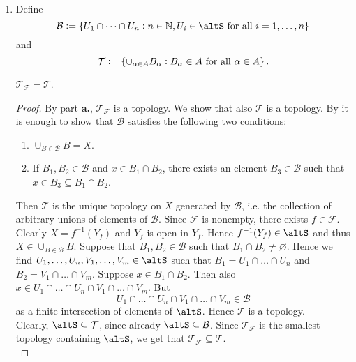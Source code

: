 \begin{enumerate}[label = \textbf{Exercise \arabic*.},wide = 0pt, itemsep = 1.5ex]
\begin{enumerate}[label = \textbf{\alph*.},wide = 0pt, itemsep = 1.5ex]
			\item Define
				\begin{equation*}
					\mathcal{B} := \cbr{U_1 \cap \dots \cap U_n : n \in \mathbb{N},U_i \in \mathcal{\altS} \text{ for all } i = 1,\dots,n}
				\end{equation*}
				\noindent and 
				\begin{equation*}
					\mathcal{T} := \cbr{\textstyle{\cup}_{\alpha \in A} B_\alpha : B_\alpha \in A \text{ for all } \alpha \in A}.
				\end{equation*}
		
				\begin{lemma}
					$\mathcal{T}_\mathcal{F} = \mathcal{T}$.
				\end{lemma}

				\begin{proof}
					By part \textbf{a.}, $\mathcal{T}_\mathcal{F}$ is a topology. We show that also $\mathcal{T}$ is a topology. By \cite[34]{lee:topological_manifolds:2011} it is enough to show that $\mathcal{B}$ satisfies the following two conditions:
					\begin{enumerate}[label = (\roman*)]
						\item $\cup_{B \in \mathcal{B}} B = X$.
						\item If $B_1,B_2 \in \mathcal{B}$ and $x \in B_1 \cap B_2$, there exists an element $B_3 \in \mathcal{B}$ such that $x \in B_3 \subseteq B_1 \cap B_2$.
					\end{enumerate}
					Then $\mathcal{T}$ is the unique topology on $X$ generated by $\mathcal{B}$, i.e. the collection of arbitrary unions of elements of $\mathcal{B}$. Since $\mathcal{F}$ is nonempty, there exists $f \in \mathcal{F}$. Clearly $X = f^{-1}(Y_f)$ and $Y_f$ is open in $Y_f$. Hence $f^{-1}(Y_f) \in \mathcal{\altS}$ and thus $X \in \cup_{B \in \mathcal{B}} B$. Suppose that $B_1,B_2 \in \mathcal{B}$ such that $B_1 \cap B_2 \neq \varnothing$. Hence we find $U_1,\dots,U_n,V_1,\dots,V_m \in \mathcal{\altS}$ such that $B_1 = U_1 \cap \dots \cap U_n$ and $B_2 = V_1 \cap \dots \cap V_m$. Suppose $x \in B_1 \cap B_2$. Then also $x \in U_1 \cap \dots \cap U_n \cap V_1 \cap \dots \cap V_m$. But 
					\begin{equation*}
						U_1 \cap \dots \cap U_n \cap V_1 \cap \dots \cap V_m \in \mathcal{B}
					\end{equation*}
					\noindent as a finite intersection of elements of $\mathcal{\altS}$. Hence $\mathcal{T}$ is a topology.\\
					Clearly, $\mathcal{\altS} \subseteq \mathcal{T}$, since already $\mathcal{\altS} \subseteq \mathcal{B}$. Since $\mathcal{T}_\mathcal{F}$ is the smallest topology containing $\mathcal{\altS}$, we get that $\mathcal{T}_\mathcal{F} \subseteq \mathcal{T}$.\\

\end{proof}
\end{enumerate}
\end{enumerate}
